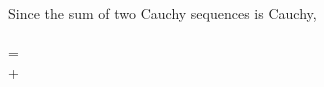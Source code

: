 \documentclass[preview]{standalone}
\begin{document}
\begin{center}
Since the sum of two Cauchy sequences is Cauchy,\\\\[a_n + b_n\\] = \\[a_n\\] + \\[b_n\\]
\end{center}
\end{document}
